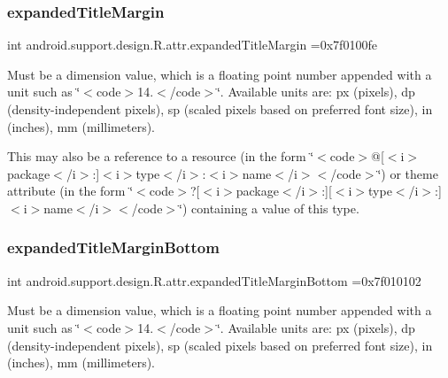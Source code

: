 \subsubsection{\texorpdfstring{expanded\+Title\+Margin}{expandedTitleMargin}}
{\footnotesize\ttfamily int android.\+support.\+design.\+R.\+attr.\+expanded\+Title\+Margin =0x7f0100fe\hspace{0.3cm}{\ttfamily [static]}}

Must be a dimension value, which is a floating point number appended with a unit such as \char`\"{}$<$code$>$14.\+5sp$<$/code$>$\char`\"{}. Available units are\+: px (pixels), dp (density-\/independent pixels), sp (scaled pixels based on preferred font size), in (inches), mm (millimeters). 

This may also be a reference to a resource (in the form \char`\"{}$<$code$>$@\mbox{[}$<$i$>$package$<$/i$>$\+:\mbox{]}$<$i$>$type$<$/i$>$\+:$<$i$>$name$<$/i$>$$<$/code$>$\char`\"{}) or theme attribute (in the form \char`\"{}$<$code$>$?\mbox{[}$<$i$>$package$<$/i$>$\+:\mbox{]}\mbox{[}$<$i$>$type$<$/i$>$\+:\mbox{]}$<$i$>$name$<$/i$>$$<$/code$>$\char`\"{}) containing a value of this type. \mbox{\label{classandroid_1_1support_1_1design_1_1R_1_1attr_a82d8696e9d3143d7e7a033ac65f01c38}} 
\subsubsection{\texorpdfstring{expanded\+Title\+Margin\+Bottom}{expandedTitleMarginBottom}}
{\footnotesize\ttfamily int android.\+support.\+design.\+R.\+attr.\+expanded\+Title\+Margin\+Bottom =0x7f010102\hspace{0.3cm}{\ttfamily [static]}}

Must be a dimension value, which is a floating point number appended with a unit such as \char`\"{}$<$code$>$14.\+5sp$<$/code$>$\char`\"{}. Available units are\+: px (pixels), dp (density-\/independent pixels), sp (scaled pixels based on preferred font size), in (inches), mm (millimeters). 

